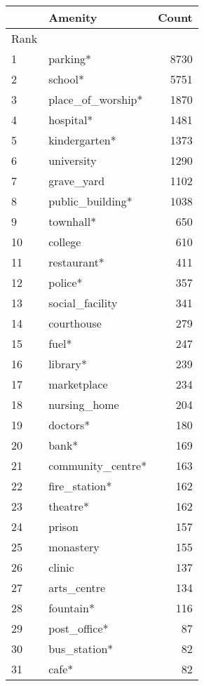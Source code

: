 \begin{tabular}{llr}
\toprule
{} &            Amenity &  Count \\
\midrule
Rank &                    &        \\
1    &           parking* &   8730 \\
2    &            school* &   5751 \\
3    &  place\_of\_worship* &   1870 \\
4    &          hospital* &   1481 \\
5    &      kindergarten* &   1373 \\
6    &         university &   1290 \\
7    &         grave\_yard &   1102 \\
8    &   public\_building* &   1038 \\
9    &          townhall* &    650 \\
10   &            college &    610 \\
11   &        restaurant* &    411 \\
12   &            police* &    357 \\
13   &    social\_facility &    341 \\
14   &         courthouse &    279 \\
15   &              fuel* &    247 \\
16   &           library* &    239 \\
17   &        marketplace &    234 \\
18   &       nursing\_home &    204 \\
19   &           doctors* &    180 \\
20   &              bank* &    169 \\
21   &  community\_centre* &    163 \\
22   &      fire\_station* &    162 \\
23   &           theatre* &    162 \\
24   &             prison &    157 \\
25   &          monastery &    155 \\
26   &             clinic &    137 \\
27   &        arts\_centre &    134 \\
28   &          fountain* &    116 \\
29   &       post\_office* &     87 \\
30   &       bus\_station* &     82 \\
31   &              cafe* &     82 \\

\end{tabular}
